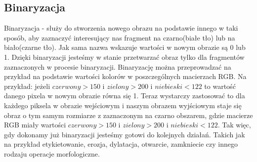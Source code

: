 \documentclass{article}
\begin{document}
        \subsection{Binaryzacja}
        {
            \label{sec:binaryzacja}
            \Large
            \justifying
            \quad
            Binaryzacja - służy do stworzenia nowego obrazu na podstawie innego w taki sposób, aby zaznaczyć interesujący nas fragment na czarno(białe tło)
            lub na biało(czarne tło). Jak sama nazwa wskazuje wartości w nowym obrazie są 0 lub 1. Dzięki binaryzacji jesteśmy w stanie przetwarzać obraz
            tylko dla fragmentów zaznaczonych w procesie binaryzacji. Binaryzację można przeprowadzać na przykład na podstawie wartości kolorów w poszczególnych
            macierzach RGB. Na przykład: 
            jeżeli \(czerwony > 150\) i \(zielony > 200\) i \(niebieski < 122\) to wartość danego pixela w nowym obrazie równa się 1.
            Teraz wystarczy zastosować to dla każdego piksela w obrazie wejściowym i naszym obrazem wyjściowym staje się obraz o tym samym rozmiarze
            z zaznaczonym na czarno obszarem, gdzie macierze RGB miały wartości \(czerwony > 150\) i \(zielony > 200\) i \(niebieski < 122\).
            Tak więc, gdy dokonamy już binaryzacji jesteśmy gotowi do kolejnych działań.
            Takich jak na przykład etykietowanie, erozja, dylatacja, otwarcie, zamkniecie czy innego rodzaju operacje morfologiczne. \cite{digitalimageprocessing}
        }
\end{document}
